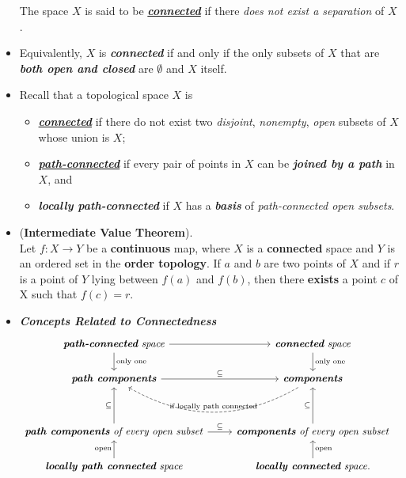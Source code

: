 \documentclass[11pt]{article}
\begin{document}
\begin{itemize}
\begin{definition}
The space $X$ is said to be \underline{\emph{\textbf{connected}}} if there \emph{does not exist a separation} of $X$.
\end{definition}

\item  \begin{definition} 
Equivalently, $X$ is \emph{\textbf{connected}} if and only if the only subsets of $X$ that are \emph{\textbf{both open and closed}} are $\emptyset$
and $X$ itself.
\end{definition}

\item \begin{definition}
Recall that a topological space $X$ is
\begin{itemize}
\item \underline{\emph{\textbf{connected}}} if there do not exist two \emph{disjoint}, \emph{nonempty}, \emph{open} subsets of $X$ whose union is $X$;
\item \underline{\emph{\textbf{path-connected}}} if every pair of points in $X$ can be \emph{\textbf{joined by a path}} in $X$, and
\item \emph{\textbf{locally path-connected}} if $X$ has a \emph{\textbf{basis}} of \emph{path-connected open subsets}.
\end{itemize}
\end{definition}

\item \begin{theorem} (\textbf{Intermediate Value Theorem}).  \citep{munkres2000topology}\\
Let $f : X \rightarrow Y$ be a \textbf{continuous} map, where $X$ is a \textbf{connected} space and $Y$ is an ordered set in the \textbf{order topology}. If $a$ and $b$ are two points of $X$ and if $r$ is a point of $Y$ lying between $f(a)$ and $f(b)$, then there \textbf{exists} a point $c$ of X such that $f(c) = r$.
\end{theorem}

\item  \emph{\textbf{Concepts Related to Connectedness}}
\[
  \begin{tikzcd}
 \text{\emph{\textbf{path-connected} space}}  \arrow{d}{\text{only one}}   \arrow{r}{} &  \text{\emph{\textbf{connected} space}}  \arrow{d}{\text{only one}} \\
   \text{\emph{\textbf{path components}}}   \arrow{r}{\subseteq }  &\arrow[l, swap, bend left, dashed, "\text{if locally path connected}"]  \text{\emph{\textbf{components}}}\\
   & & \\
   \text{\emph{\textbf{path components} of every open subset}}   \arrow{r}{\subseteq } \arrow{uu}{\subseteq } & \text{\emph{\textbf{components}  of every open subset}} \arrow{uu}{\subseteq }\\
  \text{\emph{\textbf{locally path connected} space}} \arrow[u, "\text{open}"]  & \text{\emph{\textbf{locally connected} space}} \arrow[u, swap, "\text{open}"].
  \end{tikzcd}
\] 
\end{itemize}
\end{document}
